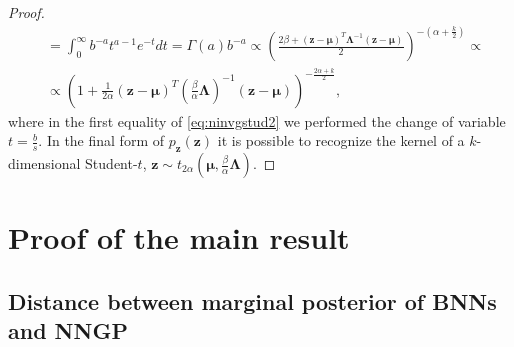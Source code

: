 \documentclass[a4paper, 11pt, reqno]{amsart}
\theoremstyle{plain}
\theoremstyle{remark}
\theoremstyle{definition}
\newcommand{\tstud}[3]{t_{#1}\left(#2, #3\right)}
\begin{document}
\begin{proof}
\begin{equation}
\begin{aligned}
			& = \int_{0}^{\infty} b^{-a} t^{a - 1} e^{-t} dt = \Gamma(a) b^{-a} \propto \left(\frac{2 \beta + (\bm{z} - \bm{\mu})^T \bm{\Lambda}^{-1} (\bm{z} - \bm{\mu})}{2}\right)^{-\left(\alpha + \frac{k}{2}\right)} \propto \\
			& \propto \left(1 + \frac{1}{2 \alpha} (\bm{z} - \bm{\mu})^T \left(\frac{\beta}{\alpha} \bm{\Lambda}\right)^{-1} (\bm{z} - \bm{\mu})\right)^{-\frac{2\alpha + k}{2}},
		\end{aligned}
	\end{equation}
	where in the first equality of \cref{eq:ninvgstud2} we performed the change of variable $t = \frac{b}{s}$. In the final form of $p_{\bm{z}}(\bm{z})$ it is possible to recognize the kernel of a $k$-dimensional Student-$t$, $\bm{z} \sim \tstud{2 \alpha}{\bm{\mu}}{\frac{\beta}{\alpha} \bm{\Lambda}}$.
\end{proof}

\section{Proof of the main result} \label{sec:mainproof}

\subsection{Distance between marginal posterior of BNNs and NNGP} \label{subsec:convposteriorsigma}
\end{document}
